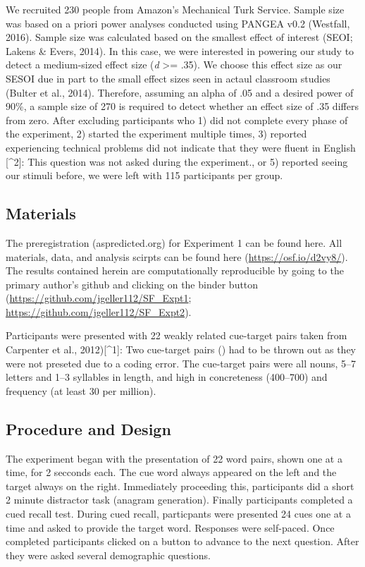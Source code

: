 \documentclass[pdf]{apa6}
\begin{document}
We recruited 230 people from Amazon's Mechanical Turk Service. Sample size was based on a priori power analyses conducted using PANGEA v0.2 (Westfall, 2016). Sample size was calculated based on the smallest effect of interest (SEOI; Lakens \& Evers, 2014). In this case, we were interested in powering our study to detect a medium-sized effect size (\emph{d} \textgreater{}= .35). We choose this effect size as our SESOI due in part to the small effect sizes seen in actaul classroom studies (Bulter et al., 2014). Therefore, assuming an alpha of .05 and a desired power of 90\%, a sample size of 270 is required to detect whether an effect size of .35 differs from zero. After excluding participants who 1) did not complete every phase of the experiment, 2) started the experiment multiple times, 3) reported experiencing technical problems did not indicate that they were fluent in English {[}\^{}2{]}: This question was not asked during the experiment., or 5) reported seeing our stimuli before, we were left with 115 participants per group.

\hypertarget{materials}{%
\subsection{Materials}\label{materials}}

The preregistration (aspredicted.org) for Experiment 1 can be found here. All materials, data, and analysis scirpts can be found here (\url{https://osf.io/d2vy8/}). The results contained herein are computationally reproducible by going to the primary author's github and clicking on the binder button (\url{https://github.com/jgeller112/SF_Expt1}; \url{https://github.com/jgeller112/SF_Expt2}).

Participants were presented with 22 weakly related cue-target pairs taken from Carpenter et al., 2012){[}\^{}1{]}: Two cue-target pairs () had to be thrown out as they were not preseted due to a coding error. The cue-target pairs were all nouns, 5--7 letters and 1--3 syllables in length, and high in concreteness (400--700) and frequency (at least 30 per million).

\hypertarget{procedure-and-design}{%
\subsection{Procedure and Design}\label{procedure-and-design}}

The experiment began with the presentation of 22 word pairs, shown one at a time, for 2 secconds each. The cue word always appeared on the left and the target always on the right. Immediately proceeding this, participants did a short 2 minute distractor task (anagram generation). Finally participants completed a cued recall test. During cued recall, particpants were presented 24 cues one at a time and asked to provide the target word. Responses were self-paced. Once completed participants clicked on a button to advance to the next question. After they were asked several demographic questions.
\end{document}
